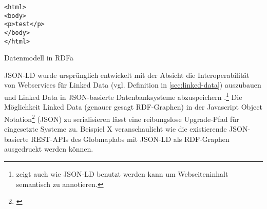 \begin{listing}[H]
\begin{verbatim}
<html>
<body>
<p>test</p>
</body>
</html>
\end{verbatim}
\caption{Datenmodell in RDFa}
\label{lst:rdfa}
\end{listing}

JSON-LD wurde ursprünglich entwickelt mit der Absicht die Interoperabilität von Webservices für Linked Data (vgl. Definition in \autoref{sec:linked-data}) auszubauen und Linked Data in JSON-basierte Datenbanksysteme abzuspeichern \parencite[vgl.][Abs.~1]{Lanthaler:14:J}.\footnote{\cite{Vincent2015} zeigt auch wie JSON-LD benutzt werden kann um Webseiteninhalt semantisch zu annotieren.} Die Möglichkeit Linked Data (genauer gesagt RDF-Graphen) in der Javascript Object Notation\footnote{\cite[vgl.]{ecma2013}} (JSON) zu serialisieren lässt eine reibungslose Upgrade-Pfad für eingesetzte Systeme zu. Beispiel X veranschaulicht wie die existierende JSON-basierte REST-APIs des Globmaplabs mit JSON-LD als RDF-Graphen ausgedruckt werden können.